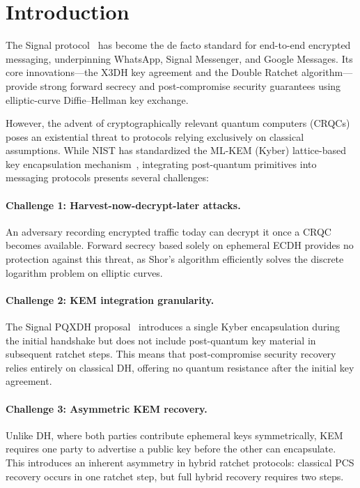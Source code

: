 \documentclass[11pt,a4paper]{article}
\theoremstyle{definition}
\begin{document}
\section{Introduction}\label{sec:intro}

The Signal protocol~\cite{signal-x3dh,cohn-gordon2020} has become the de facto standard for end-to-end encrypted messaging, underpinning WhatsApp, Signal Messenger, and Google Messages. Its core innovations---the X3DH key agreement and the Double Ratchet algorithm---provide strong forward secrecy and post-compromise security guarantees using elliptic-curve Diffie--Hellman key exchange.

However, the advent of cryptographically relevant quantum computers (CRQCs) poses an existential threat to protocols relying exclusively on classical assumptions. While NIST has standardized the ML-KEM (Kyber) lattice-based key encapsulation mechanism~\cite{fips203}, integrating post-quantum primitives into messaging protocols presents several challenges:

\paragraph{Challenge 1: Harvest-now-decrypt-later attacks.}
An adversary recording encrypted traffic today can decrypt it once a CRQC becomes available. Forward secrecy based solely on ephemeral ECDH provides no protection against this threat, as Shor's algorithm efficiently solves the discrete logarithm problem on elliptic curves.

\paragraph{Challenge 2: KEM integration granularity.}
The Signal PQXDH proposal~\cite{signal-pqxdh} introduces a single Kyber encapsulation during the initial handshake but does not include post-quantum key material in subsequent ratchet steps. This means that post-compromise security recovery relies entirely on classical DH, offering no quantum resistance after the initial key agreement.

\paragraph{Challenge 3: Asymmetric KEM recovery.}
Unlike DH, where both parties contribute ephemeral keys symmetrically, KEM requires one party to advertise a public key before the other can encapsulate. This introduces an inherent asymmetry in hybrid ratchet protocols: classical PCS recovery occurs in one ratchet step, but full hybrid recovery requires two steps.
\end{document}
